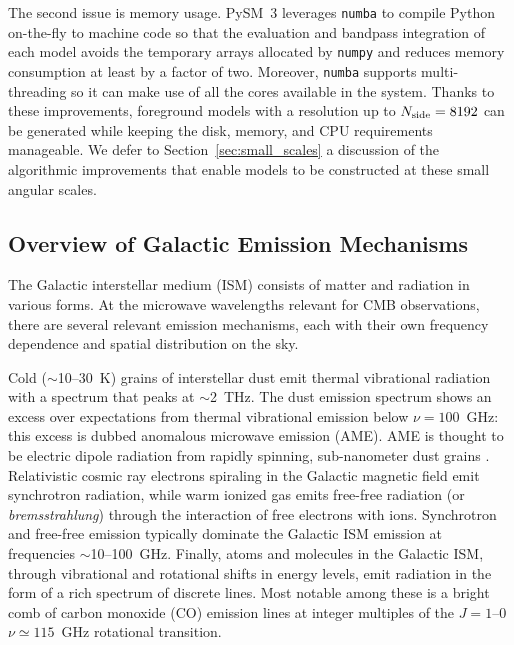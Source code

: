 \documentclass[twocolumn]{aastex631}
\begin{document}
The second issue is memory usage. PySM~3 leverages \texttt{numba} \citep{Lam:2015} to compile Python on-the-fly to machine code so that the evaluation and bandpass integration of each model avoids the temporary arrays allocated by \texttt{numpy} and reduces memory consumption at least by a factor of two. Moreover, \texttt{numba} supports multi-threading so it can make use of all the cores available in the system. Thanks to these improvements, foreground models with a resolution up to $N_{\rm side}=8192$ can be generated while keeping the disk, memory, and CPU requirements manageable. We defer to Section~\ref{sec:small_scales} a discussion of the algorithmic improvements that enable models to be constructed at these small angular scales.

\subsection{Overview of Galactic Emission Mechanisms} \label{sec:emission_mechanisms}
The Galactic interstellar medium (ISM) consists of matter and radiation in various forms. At the microwave wavelengths relevant for CMB observations, there are several relevant emission mechanisms, each with their own frequency dependence and spatial distribution on the sky.

Cold ($\sim$10--30~K) grains of interstellar dust emit thermal vibrational radiation with a spectrum that peaks at $\sim$2~THz. The dust emission spectrum shows an excess over expectations from thermal vibrational emission below $\nu=100$~GHz: this excess is dubbed anomalous microwave emission (AME). AME is thought to be electric dipole radiation from rapidly spinning, sub-nanometer dust grains \citep{Draine:1998b}. Relativistic cosmic ray electrons spiraling in the Galactic magnetic field emit synchrotron radiation, while warm ionized gas emits free-free radiation (or \emph{bremsstrahlung}) through the interaction of free electrons with ions. Synchrotron and free-free emission typically dominate the Galactic ISM emission at frequencies $\sim$10--100~GHz. Finally, atoms and molecules in the Galactic ISM, through vibrational and rotational shifts in energy levels, emit radiation in the form of a rich spectrum of discrete lines. Most notable among these is a bright comb of carbon monoxide (CO) emission lines at integer multiples of the $J=1$--$0$ $\nu \simeq 115$~GHz rotational transition.
\end{document}
